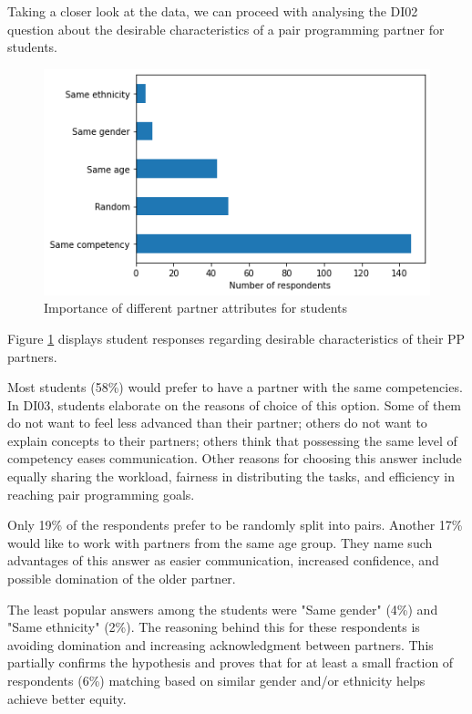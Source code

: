 \documentclass[conference]{IEEEtran}
\begin{document}
Taking a closer look at the data, we can proceed with analysing the DI02 question about the desirable characteristics of a pair programming partner for students.

\begin{figure}[ht]
\includegraphics[scale=0.5]{important-attribute.png}
\caption{Importance of different partner attributes for students}
\label{fig:impAttr}
\end{figure}

Figure \ref{fig:impAttr} displays student responses regarding desirable characteristics of their PP partners. 

Most students (58\%) would prefer to have a partner with the same competencies. In DI03, students elaborate on the reasons of choice of this option. Some of them do not want to feel less advanced than their partner; others do not want to explain concepts to their partners; others think that possessing the same level of competency eases communication. Other reasons for choosing this answer include equally sharing the workload, fairness in distributing the tasks, and efficiency in reaching pair programming goals.

Only 19\% of the respondents prefer to be randomly split into pairs. Another 17\% would like to work with partners from the same age group. They name such advantages of this answer as easier communication, increased confidence, and possible domination of the older partner.

The least popular answers among the students were "Same gender" (4\%) and "Same ethnicity" (2\%). The reasoning behind this for these respondents is avoiding domination and increasing acknowledgment between partners. This partially confirms the hypothesis and proves that for at least a small fraction of respondents (6\%) matching based on similar gender and/or ethnicity helps achieve better equity.
\end{document}
